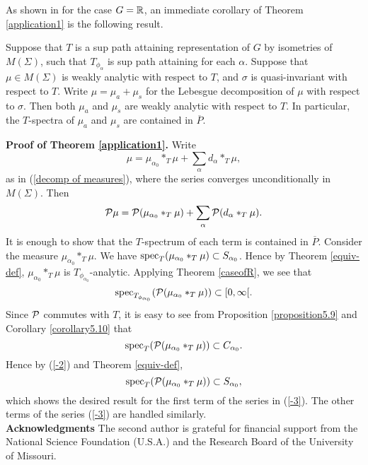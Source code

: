 \documentclass[12pt,leqno]{article}
\def\R{\Bbb R}
\def\cP{{\cal P}}
\def\spec{{\rm spec}}
\begin{document}
As shown in \cite[Theorem (4.10)]{amss} 
for the case $G=\R$, 
an immediate corollary of Theorem \ref{application1}
is the following result.


\begin{thm}
\label{application2}
Suppose that $T$ is a sup path attaining representation
of $G$ by isometries of $M(\Sigma)$, such that 
$T_{\phi_\alpha}$ is sup path attaining for each $\alpha$.
  Suppose 
that $\mu\in M(\Sigma)$ is weakly analytic with respect to $T$, and
$\sigma$ is quasi-invariant with respect to $T$.  Write
$\mu=\mu_a+\mu_s$ for the Lebesgue decomposition of $\mu$
with respect to $\sigma$.  Then both
$\mu_a$ and $\mu_s$ are weakly analytic with respect to $T$.  In particular,
the $T$-spectra of $\mu_a$ and $\mu_s$ are
contained in $\overline{P}$.
\end{thm}



{\bf Proof of Theorem \ref{application1}.}\quad
Write
$$\mu=\mu_{\alpha_0}*_T\mu +\sum_\alpha d_\alpha *_T\mu,$$
as in (\ref{decomp of measures}), where the series converges unconditionally
in $M(\Sigma)$.
Then
\begin{equation}
\label{-3}
\cP\mu=\cP(\mu_{\alpha_0}*_T\mu) +\sum_\alpha 
\cP(d_\alpha *_T\mu).
\end{equation}
It is enough to show that the $T$-spectrum of
each term is contained in $\overline{P}$.
Consider the measure 
$\mu_{\alpha_0}*_T\mu$.  We have 
$\spec_T(\mu_{\alpha_0}*_T\mu)\subset S_{\alpha_0}$.
Hence by Theorem \ref{equiv-def}, 
$\mu_{\alpha_0}*_T\mu$ is $T_{\phi_{\alpha_0}}$-analytic.  Applying Theorem \ref{caseofR}, we see that
\begin{equation}
\label{-2}
\spec_{T_{\phi_{\alpha_0}}} (\cP (\mu_{\alpha_0}*_T\mu))\subset [0,\infty[.
\end{equation}
Since $\cP$ commutes with $T$, it is easy to see  
from Proposition \ref{proposition5.9} and Corollary \ref{corollary5.10} that
$$\spec_T (\cP (\mu_{\alpha_0}*_T\mu))\subset C_{\alpha_0}.$$
Hence by (\ref{-2}) and Theorem \ref{equiv-def}, 
$$\spec_T (\cP (\mu_{\alpha_0}*_T\mu))\subset S_{\alpha_0},$$
which shows the desired result for the first term
of the series in 
(\ref{-3}).  The other terms of the series 
(\ref{-3}) are handled similarly.
\\

\noindent
{\bf Acknowledgments}  The second author is 
grateful for financial support from the National Science Foundation (U.S.A.) and the Research Board of the 
University of Missouri.
\end{document}

